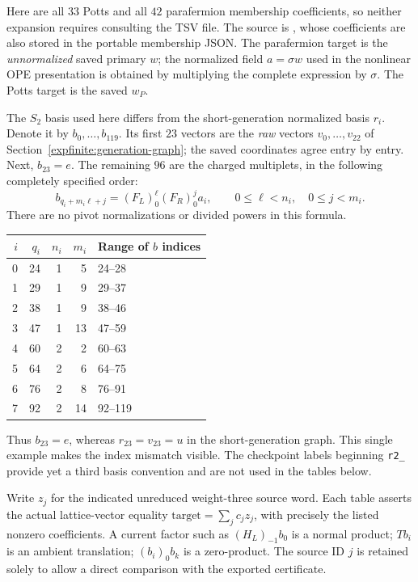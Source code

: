 Here are all $33$ Potts and all $42$ parafermion membership coefficients,
so neither expansion requires consulting the TSV file. The source is
,
whose coefficients are also stored in the portable membership JSON.
The parafermion target is the \emph{unnormalized} saved primary $w$;
the normalized field $a=\sigma w$ used in the nonlinear OPE
presentation is obtained by multiplying the complete expression by
$\sigma$. The Potts target is the saved $w_P$.

The $S_2$ basis used here differs from the short-generation normalized
basis $r_i$. Denote it by $b_0,\ldots,b_{119}$. Its first $23$ vectors
are the \emph{raw} vectors $v_0,\ldots,v_{22}$ of
Section~\ref{expfinite:generation-graph}; the saved coordinates agree
entry by entry. Next, $b_{23}=e$. The remaining $96$ are the charged
multiplets, in the following completely specified order:
\[
 b_{q_i+m_i\ell+j}=(F_L)_0^\ell(F_R)_0^ja_i,
 \qquad0\le\ell<n_i,\quad0\le j<m_i.
\]
There are no pivot normalizations or divided powers in this formula.
\begin{center}\small
\begin{tabular}{@{}rrrrl@{}}
\toprule
$i$&$q_i$&$n_i$&$m_i$&Range of $b$ indices\\\midrule
0&24&1&5&24--28\\
1&29&1&9&29--37\\
2&38&1&9&38--46\\
3&47&1&13&47--59\\
4&60&2&2&60--63\\
5&64&2&6&64--75\\
6&76&2&8&76--91\\
7&92&2&14&92--119\\\bottomrule
\end{tabular}
\end{center}
Thus $b_{23}=e$, whereas $r_{23}=v_{23}=u$ in the short-generation
graph. This single example makes the index mismatch visible. The
checkpoint labels beginning \texttt{r2\_} provide yet a third
basis convention and are not used in the tables below.

Write $z_j$ for the indicated unreduced weight-three source word.
Each table asserts the actual lattice-vector equality
$\text{target}=\sum_j c_jz_j$, with precisely the listed nonzero
coefficients. A current factor such as $(H_L)_{-1}b_0$ is a normal
product; $Tb_i$ is an ambient translation; $(b_i)_0b_k$ is a
zero-product. The source ID $j$ is retained solely to allow a direct
comparison with the exported certificate.

